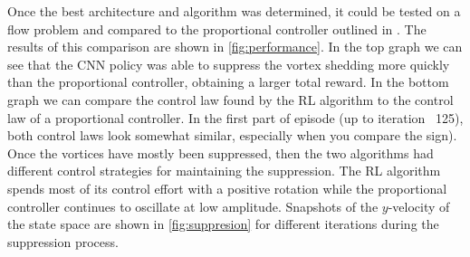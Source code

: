 \documentclass{article}
\begin{document}
Once the best architecture and algorithm was determined, it could be tested on a flow problem and compared to the proportional controller outlined in \cite{morton2018deep}. The results of this comparison are shown in \cref{fig:performance}. In the top graph we can see that the CNN policy was able to suppress the vortex shedding more quickly than the proportional controller, obtaining a larger total reward. In the bottom graph we can compare the control law found by the RL algorithm to the control law of a proportional controller. In the first part of episode (up to iteration ~125), both control laws look somewhat similar, especially when you compare the sign). Once the vortices have mostly been suppressed, then the two algorithms had different control strategies for maintaining the suppression. The RL algorithm spends most of its control effort with a positive rotation while the proportional controller continues to oscillate at low amplitude. Snapshots of the $y$-velocity of the state space are shown in \cref{fig:suppresion} for different iterations during the suppression process.
\end{document}
